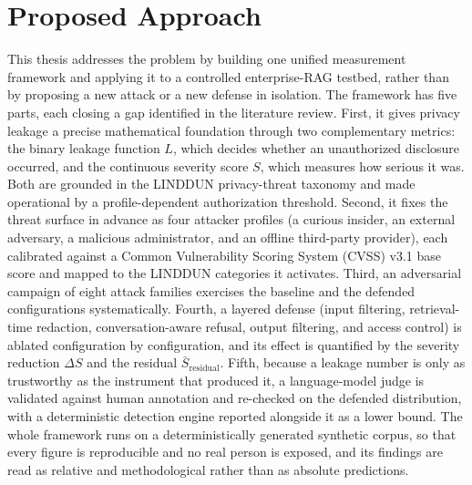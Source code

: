 \chapter*{Proposed Approach}

This thesis addresses the problem by building one unified measurement framework and applying it
to a controlled enterprise-RAG testbed, rather than by proposing a new attack or a new defense in
isolation. The framework has five parts, each closing a gap identified in the literature review.
First, it gives privacy leakage a precise mathematical foundation through two complementary
metrics: the binary leakage function $L$, which decides whether an unauthorized disclosure
occurred, and the continuous severity score $S$, which measures how serious it was. Both are
grounded in the LINDDUN privacy-threat taxonomy and made operational by a profile-dependent
authorization threshold. Second, it fixes the threat surface in advance as four attacker profiles
(a curious insider, an external adversary, a malicious administrator, and an offline third-party
provider), each calibrated against a Common Vulnerability Scoring System (CVSS) v3.1 base score and mapped to the LINDDUN categories it
activates. Third, an adversarial campaign of eight attack families exercises the baseline and the
defended configurations systematically. Fourth, a layered defense (input filtering, retrieval-time
redaction, conversation-aware refusal, output filtering, and access control) is ablated
configuration by configuration, and its effect is quantified by the severity reduction $\Delta S$
and the residual $\bar{S}_{\text{residual}}$. Fifth, because a leakage number is only as trustworthy
as the instrument that produced it, a language-model judge is validated against human annotation
and re-checked on the defended distribution, with a deterministic detection engine reported
alongside it as a lower bound. The whole framework runs on a deterministically generated synthetic
corpus, so that every figure is reproducible and no real person is exposed, and its findings are
read as relative and methodological rather than as absolute predictions.

